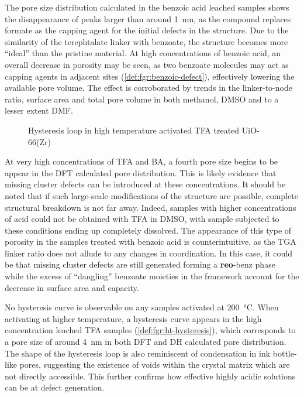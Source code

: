 The pore size distribution calculated in the benzoic acid leached
samples shows the disappearance of peaks larger than around 
\SI{1}{\nano\metre}, as the compound replaces formate as the 
capping agent for the initial defects in the structure. Due to the 
similarity of the terephtalate linker with benzoate, the structure
becomes more ``ideal'' than the pristine material. At high concentrations
of benzoic acid, an overall decrease in porosity may be seen, as 
two benzoate molecules may act as capping agents in adjacent 
sites (\autoref{def:fgr:benzoic-defect}), effectively 
lowering the available pore volume. The effect is corroborated 
by trends in the linker-to-node ratio, surface area and total 
pore volume in both methanol, DMSO and to a lesser extent DMF.

\begin{wrapfigure}[15]{r}{0.3\textwidth}
    \centering
    \captionsetup{format=plain}
    \caption{Hysteresis loop in high temperature activated TFA treated 
    UiO-66(Zr)}%
    \label{def:fgr:ht-hysteresis}
\end{wrapfigure}

At very high concentrations of TFA and BA, a fourth pore size
begins to be appear in the DFT calculated pore distribution.
This is likely evidence that missing cluster defects can be 
introduced at these concentrations. It should be noted that 
if such large-scale modifications of the structure are possible,
complete structural breakdown is not far away. Indeed, samples with 
higher concentrations of acid could not be obtained with TFA in DMSO,
with sample subjected to these conditions ending up completely
dissolved. The appearance of this type of porosity in the samples
treated with benzoic acid is counterintuitive, as the TGA linker
ratio does not allude to any changes in coordination. In this case,
it could be that missing cluster defects are still generated
forming a \textbf{reo}-benz phase~\cite{atzoriEffectBenzoicAcid2017} 
while the excess of ``dangling'' benzoate moieties in the framework 
account for the decrease in surface area and capacity.

No hysteresis curve is observable on any samples activated at 
\SI{200}{\degreeCelsius}. When activating at higher temperature,
a hysteresis curve appears in the high concentration leached
TFA samples (\autoref{def:fgr:ht-hysteresis}), which corresponds to
a pore size of around \SI{4}{\nano\metre} in both DFT and DH calculated
pore distribution. The shape of the hysteresis loop is also 
reminiscent of condensation in ink bottle-like pores, suggesting
the existence of voids within the crystal matrix which are 
not directly accessible. This further confirms how effective 
highly acidic solutions can be at defect generation.